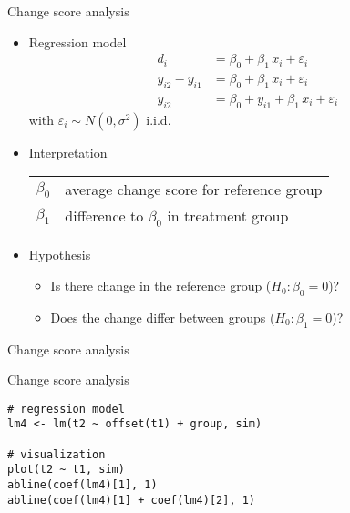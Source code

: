 \documentclass{beamer}
\begin{document}
\begin{frame}{Change score analysis}
\begin{itemize}
  \item Regression model
    \begin{align*}
                  d_i &= \beta_0 + \beta_1 \, x_i + \varepsilon_i \\
      y_{i2} - y_{i1} &= \beta_0 + \beta_1 \, x_i + \varepsilon_i \\
               y_{i2} &= \beta_0 + y_{i1} + \beta_1 \, x_i + \varepsilon_i
    \end{align*}
    with $\varepsilon_i \sim N(0, \sigma^2)$ i.i.d.
  \item Interpretation
    \begin{tabular}{lp{10cm}}
    $\beta_0$ & average change score for reference group\\
    $\beta_1$ & difference to $\beta_0$ in treatment group
    \end{tabular}
  \item Hypothesis
    \begin{itemize}
        \item Is there change in the reference group ($H_0\colon \beta_0 = 0$)?
        \item Does the change differ between groups ($H_0\colon \beta_1 =0$)?
    \end{itemize}
\end{itemize}
\end{frame}


\begin{frame}{Change score analysis}
\begin{center}
\end{center}
\end{frame}

{

\begin{frame}[fragile]{Change score analysis}
\begin{lstlisting}
# regression model
lm4 <- lm(t2 ~ offset(t1) + group, sim)

# visualization
plot(t2 ~ t1, sim)
abline(coef(lm4)[1], 1)
abline(coef(lm4)[1] + coef(lm4)[2], 1)
\end{lstlisting}
\end{frame}

}
\end{document}
